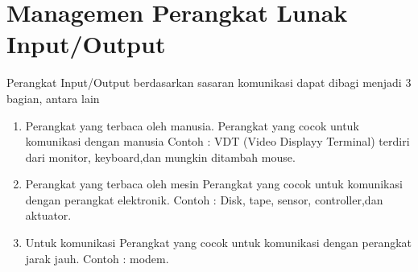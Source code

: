 \chapter{Managemen Perangkat Lunak Input/Output}
Perangkat Input/Output berdasarkan sasaran komunikasi dapat dibagi menjadi 3 bagian, antara lain 
\begin{enumerate} 
\item Perangkat yang terbaca oleh manusia.
   Perangkat yang cocok untuk komunikasi dengan manusia
   Contoh : VDT (Video Displayy Terminal) terdiri dari monitor, keyboard,dan mungkin 
   ditambah mouse.
\item Perangkat yang terbaca oleh mesin
   Perangkat yang cocok untuk komunikasi dengan perangkat elektronik.
   Contoh : Disk, tape, sensor, controller,dan aktuator.

\item Untuk komunikasi
   Perangkat yang cocok untuk komunikasi dengan perangkat jarak jauh.
   Contoh : modem.
\end{enumerate}